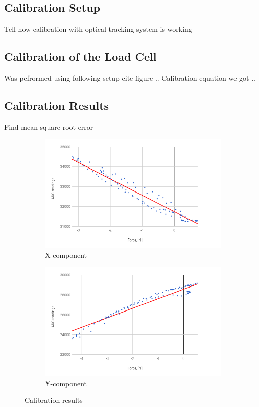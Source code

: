 	\subsection{Calibration Setup}
	\label{sec:CalSetup}
	Tell how calibration with optical tracking system is working

	\subsection{Calibration of the Load Cell}
	\label{sec:CalLoadCell}
	Was pefrormed using following setup cite figure ..
	Calibration equation we got ..

	\subsection{Calibration Results}
	Find mean square root error

		\begin{figure}
			\centering
			\begin{subfigure}
				\centering
				\includegraphics[width=120mm]{fig/results/x-dir.png}
				\caption{X-component}
				\label{fig:Xdirection}
			\end{subfigure}
			\begin{subfigure}
				\centering
				\includegraphics[width=120mm]{fig/results/y-dir.png}
				\caption{Y-component}
				\label{fig:Ydirection}
			\end{subfigure}
			\caption{Calibration results}
			\label{fig:Calibration}
		\end{figure}

